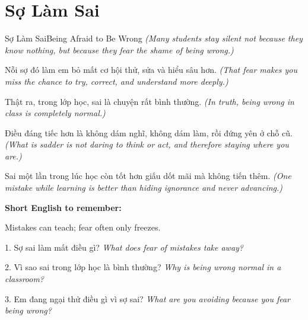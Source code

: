 \section{Sợ Làm Sai}
\begin{truyen}{Sợ Làm Sai}{Being Afraid to Be Wrong}
\textit{(Many students stay silent not because they know nothing, but because they fear the shame of being wrong.)}

Nỗi sợ đó làm em bỏ mất cơ hội thử, sửa và hiểu sâu hơn.
\textit{(That fear makes you miss the chance to try, correct, and understand more deeply.)}

Thật ra, trong lớp học, sai là chuyện rất bình thường.
\textit{(In truth, being wrong in class is completely normal.)}

Điều đáng tiếc hơn là không dám nghĩ, không dám làm, rồi đứng yên ở chỗ cũ.
\textit{(What is sadder is not daring to think or act, and therefore staying where you are.)}
\end{truyen}

\begin{baihoc}
Sai một lần trong lúc học còn tốt hơn giấu dốt mãi mà không tiến thêm.
\textit{(One mistake while learning is better than hiding ignorance and never advancing.)}
\end{baihoc}

\begin{ghinhoanh}
\textbf{Short English to remember:}

Mistakes can teach; fear often only freezes.

\end{ghinhoanh}

\begin{tuhocnhanh}
1. Sợ sai làm mất điều gì? \textit{What does fear of mistakes take away?}

2. Vì sao sai trong lớp học là bình thường? \textit{Why is being wrong normal in a classroom?}

3. Em đang ngại thử điều gì vì sợ sai? \textit{What are you avoiding because you fear being wrong?}
\end{tuhocnhanh}
\ngancach

